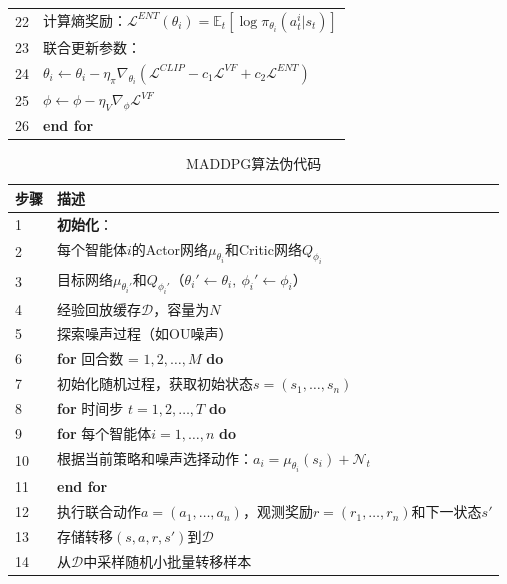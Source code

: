 \begin{table}[!ht]
\begin{tabular}{lp{}}
22 & \quad \quad \quad 计算熵奖励：$\mathcal{L}^{ENT}(\theta_i) = \mathbb{E}_t\left[ \log \pi_{\theta_i}(a_t^i|s_t) \right]$\\
23 & \quad \quad \quad 联合更新参数：\\
24  & \quad \quad $\theta_i \leftarrow \theta_i - \eta_{\pi} \nabla_{\theta_i} (\mathcal{L}^{CLIP} - c_1 \mathcal{L}^{VF} + c_2 \mathcal{L}^{ENT})$\\
25  & \quad \quad $\phi \leftarrow \phi - \eta_{V} \nabla_{\phi} \mathcal{L}^{VF}$\\

26 & \textbf{end for} \\
\bottomrule
\end{tabular}
\end{table}


\begin{table}[!ht]
\centering
\caption{MADDPG算法伪代码}
\label{tab:maddpg}
\begin{tabular}{lp{}}
\toprule
\textbf{步骤} & \textbf{描述} \\
\midrule
1 & \textbf{初始化}：\\
2   & \quad \quad 每个智能体$i$的Actor网络$\mu_{\theta_i}$和Critic网络$Q_{\phi_i}$ \\
3   & \quad \quad 目标网络$\mu_{\theta_i'}$和$Q_{\phi_i'}$（$\theta_i' \leftarrow \theta_i,\ \phi_i' \leftarrow \phi_i$）\\
4   & \quad \quad 经验回放缓存$\mathcal{D}$，容量为$N$ \\
5   & \quad \quad 探索噪声过程（如OU噪声）\\

6 & \textbf{for} 回合数 = $1, 2, \dots, M$ \textbf{do} \\
7 & \quad 初始化随机过程，获取初始状态$s = (s_1, \dots, s_n)$ \\
8 & \quad \textbf{for} 时间步 $t = 1, 2, \dots, T$ \textbf{do} \\
9 & \quad\quad \textbf{for} 每个智能体$i=1,\dots,n$ \textbf{do} \\
10 & \quad\quad\quad 根据当前策略和噪声选择动作：$a_i = \mu_{\theta_i}(s_i) + \mathcal{N}_t$ \\
11 & \quad\quad \textbf{end for} \\
12 & \quad\quad 执行联合动作$a = (a_1, \dots, a_n)$，观测奖励$r = (r_1, \dots, r_n)$和下一状态$s'$ \\
13 & \quad\quad 存储转移$(s, a, r, s')$到$\mathcal{D}$ \\
14 & \quad\quad 从$\mathcal{D}$中采样随机小批量转移样本\\


\end{tabular}
\end{table}
